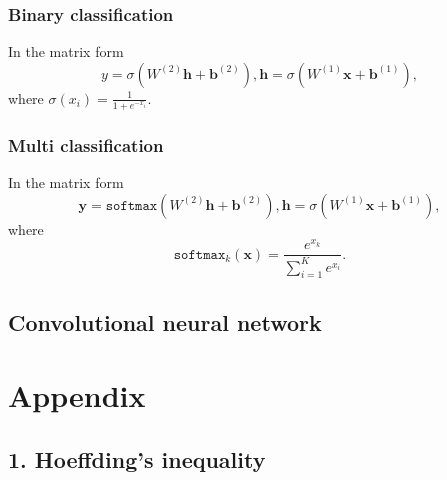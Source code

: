 \documentclass{report}
\theoremstyle{nonumberplain}
\newcommand{\0}{\mathbf{0}}
\begin{document}
\subsection{Binary classification}
In the matrix form
\[
y=\sigma(W^{(2)}\mathbf{h}+\mathbf{b}^{(2)}),\mathbf{h}=\sigma(W^{(1)}\mathbf{x}+\mathbf{b}^{(1)}),
\]
where $\sigma(x_i)=\frac{1}{1+e^{-x_i}}$.

\subsection{Multi classification}
In the matrix form
\[
\mathbf{y}=\mathtt{softmax}(W^{(2)}\mathbf{h}+\mathbf{b}^{(2)}),\mathbf{h}=\sigma(W^{(1)}\mathbf{x}+\mathbf{b}^{(1)}),
\]
where
\[
\mathtt{softmax}_k(\mathbf{x})=\frac{e^{x_k}}{\sum_{i=1}^{K}e^{x_i}}. 
\]

\section{Convolutional neural network}


\chapter*{Appendix}
\section*{1. Hoeffding's inequality} 
\end{document}
